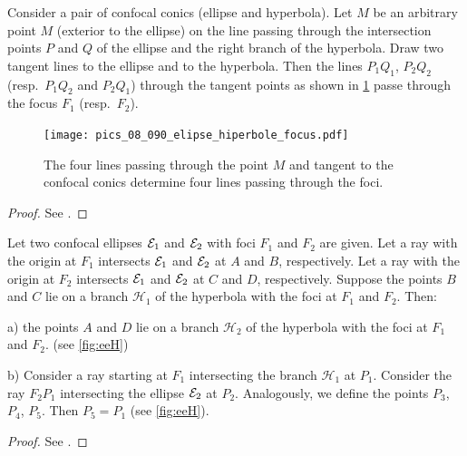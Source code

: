 \begin{theorem}\label{th:ehfocus}
Consider a pair of confocal conics (ellipse and hyperbola). Let $M$ be  an arbitrary point $M$ (exterior to the ellipse)
on the line passing through the intersection points $P$ and $Q$ of the ellipse and the right branch of
the hyperbola. Draw two tangent lines to the ellipse and to the hyperbola. Then the   lines $P_1Q_1$, $P_2Q_2$ (resp.\ $P_1Q_2$ and $P_2Q_1$)
through the tangent points as shown in \cref{fig:ehfocus}  passe  through the focus $F_1$ (resp.\   $F_2$). 
\end{theorem}


\begin{figure}[H]
	\begin{center}
 	 \texttt{[image: pics\_08\_090\_elipse\_hiperbole\_focus.pdf]}
		\caption {  The four lines passing through the point $M$ and tangent to the confocal conics determine four lines passing through the foci. \label{fig:ehfocus}}
	\end{center}
\end{figure}
\begin{proof}
See \cite{dolgirev2014}.

\end{proof}


\begin{theorem}
Let two confocal ellipses $\mathcal{E}_1$ and $\mathcal{E}_2$   with foci $F_1 $ and $F_2$ are given. Let a
ray with the origin at $F_1$ intersects $\mathcal{E}_1$ and $\mathcal{E}_2$ at $A$ and $B$, respectively. Let a ray with
the origin at $F_2$ intersects $\mathcal{E}_1$ and $\mathcal{E}_2$ at $C$ and $D$, respectively. Suppose the points $B$ and
$C$ lie on a branch $\mathcal{H}_1$   of the hyperbola with the foci at $F_1$ and $F_2$.
Then:

\noindent a) the points $A$
and $D$ lie on a branch $\mathcal{H}_2$ of the hyperbola with the foci at $F_1$ and $F_2$. (see \cref{fig:eeH})

\noindent b) Consider a ray starting at $F_1$ intersecting the branch $\mathcal{H}_1$ at $P_1$. Consider the ray
$F_2P_1$  intersecting the ellipse $\mathcal{E}_2$  at $P_2$. Analogously, we define the points $P_3$, $P_4$, $P_5$.
Then $P_5 = P_1$ (see \cref{fig:eeH}).
\end{theorem}

\begin{figure}[H]
	\begin{center}
		\def\svgwidth{0.75\textwidth}
 	
		\caption {}
	\end{center}
\end{figure}
\label{fig:eeH}
\begin{proof}
See \cite{dolgirev2014}.

\end{proof}

 